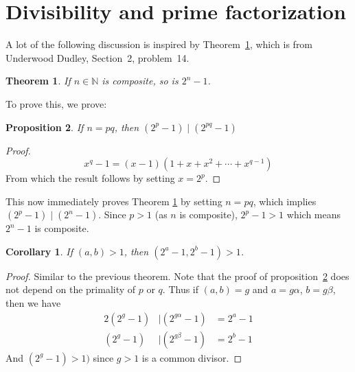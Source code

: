 \documentclass{article}
\newtheorem{thm}{Theorem}[section]
\newtheorem{prop}[thm]{Proposition}
\newtheorem{cor}{Corollary}[thm]
\theoremstyle{definition}
\newcommand{\nat}{\ensuremath{\mathbb{N}}}
\begin{document}
{}

\section{Divisibility and prime factorization}
A lot of the following discussion is inspired by
Theorem~\ref{composite_2_power}, which is from Underwood Dudley,
Section~2, problem~14.

\begin{thm}\label{composite_2_power}
  If $n\in \nat$ is composite, so is $2^n - 1$.
\end{thm}
To prove this, we prove:
\begin{prop}\label{2p_2pq}
  If $n = pq$, then $(2^p - 1)\mid (2^{pq}-1)$
\end{prop}
\begin{proof}
  \[x^q - 1 = (x - 1)(1 + x + x^2 +\cdots+ x^{q-1})\]
  From which the result follows by setting $x = 2^p$.
\end{proof}

This now immediately proves Theorem \ref{composite_2_power} by setting
$n = pq$, which implies $(2^p - 1) \mid (2^n - 1)$. Since $p > 1$ (as $n$
is composite), $2^p - 1 > 1$ which means $2^n - 1$ is composite.

\begin{cor}\label{2a_2b_gcd_match}
  If $(a,b) > 1$, then $(2^a - 1, 2^b - 1) > 1$.
\end{cor}
\begin{proof}
  Similar to the previous theorem. Note that the proof of
  proposition~\ref{2p_2pq} does not depend on the primality of $p$ or
  $q$. Thus if $(a,b) = g$ and $a = g\alpha$, $b = g\beta$, then we have
  \begin{alignat*}{2}
    (2^g - 1) & \mid (2^{g\alpha} - 1) &= 2^a - 1\\
    (2^g - 1) & \mid (2^{g\beta}  - 1) &= 2^b - 1
  \end{alignat*}
  And $(2^g - 1) > 1)$ since $g > 1$ is a common divisor.
\end{proof}
\end{document}
